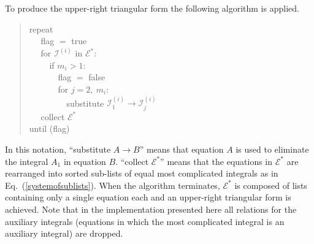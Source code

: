 \documentclass[a4paper,12pt]{scrartcl}
\newcommand*{\CE}{\mathcal{E}}
\newcommand*{\CI}{\mathcal{I}}
\def\Eq#1{{Eq.~(\ref{#1})}}
\begin{document}
To produce the upper-right triangular form the following algorithm is applied.
\begin{verse}
  repeat\\
  $\quad$ flag $=$ true\\
  $\quad$ for $\CI^{(i)}$ in $\CE^{*}$:\\
  $\quad\quad$ if $m_i>1$:\\
  $\quad\quad\quad$ flag $=$ false\\
  $\quad\quad\quad$ for $j=2,~m_i$:\\
  $\quad\quad\quad\quad$ substitute $\CI^{(i)}_1\to\CI^{(i)}_j$\\
  $\quad$ collect $\CE^*$\\
  until (flag)
\end{verse}
In this notation, ``substitute $A\to B$'' means that equation $A$ is used to
eliminate the integral $A_1$ in equation $B$. ``collect $\CE^*$'' means that the
equations in $\CE^*$ are rearranged into sorted sub-lists
of equal most complicated integrals as in \Eq{systemofsublists}. When the
algorithm terminates, $\CE^*$ is composed of lists containing only a single
equation each and an upper-right triangular form is achieved. Note that in the
implementation presented here all relations for the auxiliary integrals
(equations in which the most complicated integral is an auxiliary integral) are
dropped.
\end{document}
